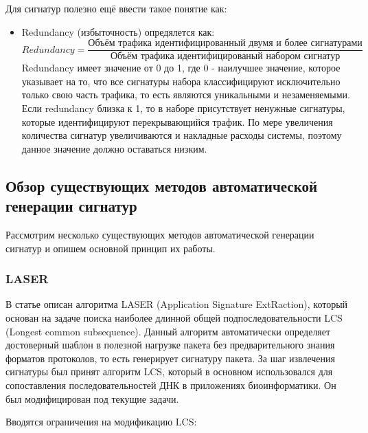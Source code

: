 Для сигнатур полезно ещё ввести такое понятие как:

\begin{itemize}
    \item Redundancy (избыточность) опредялется как:
    $$ \textit{Redundancy} = \frac{\text{Объём трафика идентифицированный двумя и более сигнатурами}}{\text{Объём трафика идентифицированый набором сигнатур}}$$
    Redundancy имеет значение от 0 до 1, где 0 - наилучшее значение, которое указывает на то, что все сигнатуры набора классифицируют исключительно только свою часть трафика,
    то есть являются уникальными и незаменяемыми. Если redundancy близка к 1, то в наборе присутствует ненужные сигнатуры, которые идентифицируют перекрывающийся трафик.
    По мере увеличения количества сигнатур увеличиваются и накладные расходы системы, поэтому данное значение должно оставаться низким.
\end{itemize}

\subsection{Обзор существующих методов автоматической генерации сигнатур}

Рассмотрим несколько существующих методов автоматической генерации сигнатур и опишем основной принцип их работы.

\subsubsection{LASER}

В статье \cite{park2008towards} описан алгоритма LASER (Application Signature ExtRaction),
который основан на задаче поиска наиболее длинной общей подпоследовательности LCS (Longest common subsequence).
Данный алгоритм автоматически определяет достоверный шаблон в полезной нагрузке пакета без предварительного знания форматов протоколов, то есть генерирует сигнатуру пакета.
За шаг извлечения сигнатуры был принят алгоритм LCS, который в основном использовался для сопоставления последовательностей ДНК в приложениях биоинформатики.
Он был модифицирован под текущие задачи.

Вводятся ограничения на модификацию LCS:

